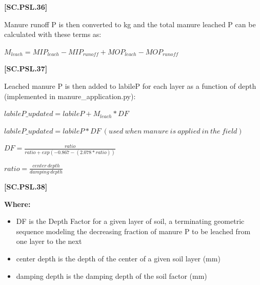             {\raggedleft \textbf{[SC.PSL.36]}\par}
            \vspace{0.5cm}

Manure runoff P is then converted to kg and the total manure leached P can be calculated with these terms as:
        \vspace{0.5cm}
        
    \begin{center}
\(M_{leach}=MIP_{leach}-MIP_{runoff}+MOP_{leach}-MOP_{runoff}\)

    \end{center}
        \vspace{0.5cm} 
    
            {\raggedleft \textbf{[SC.PSL.37]}\par}
            \vspace{0.5cm}

Leached manure P is then added to labileP for each layer as a function of depth (implemented in manure\_application.py):
        \vspace{0.5cm}
        
    \begin{center}
\(labileP\_updated=labileP+M_{leach}*DF\)
\vspace{0.1cm}

\(labileP\_updated=labileP*DF\ (used\ when\ manure\ is\ applied\ in\ the\ field)\)
\vspace{0.1cm}

\(DF=\frac{ratio}{ratio +exp(-0.867-(2.078*ratio))}\)
\vspace{0.1cm}

\(ratio=\frac{center\ depth}{damping\ depth}\)
    \end{center}
        \vspace{0.5cm} 
    
            {\raggedleft \textbf{[SC.PSL.38]}\par}
            \vspace{0.5cm}

        \textbf{Where:}
            
        \begin{itemize}
            \item DF is the Depth Factor for a given layer of soil, a terminating geometric sequence modeling the decreasing fraction of manure P to be leached from one layer to the next
            \item center depth is the depth of the center of a given soil layer (mm)
            \item damping depth is the damping depth of the soil factor (mm)
        \end{itemize}
        \vspace{0.5cm}

